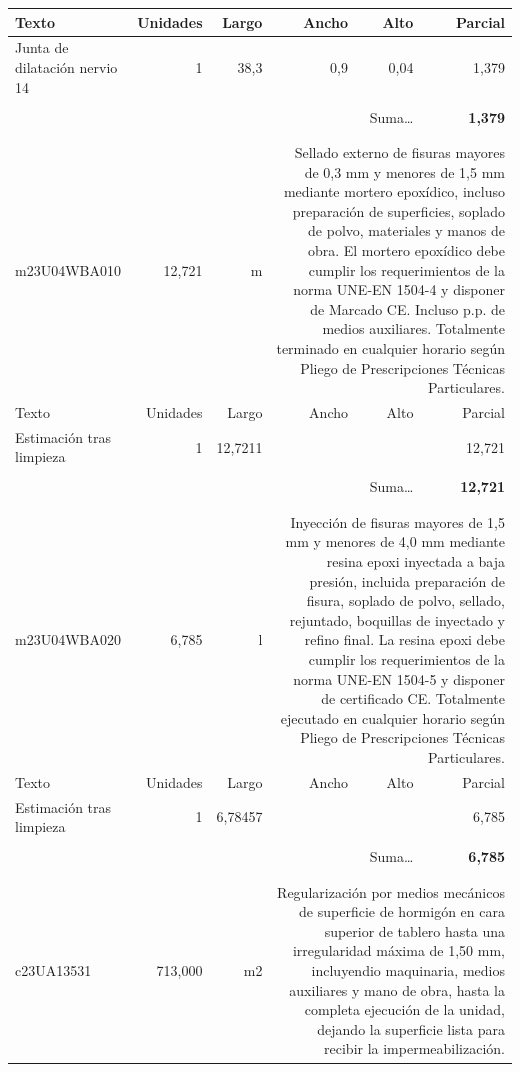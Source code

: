 \documentclass{book}%
\begin{document}
\begin{longtable}{lrrrrr}
Texto&Unidades&Largo&Ancho&Alto&Parcial\\%
\hline%
\multicolumn{1}{p{3.5cm}}{Junta de dilatación nervio 14}&1&38,3&0,9&0,04&     1,379\\%
&&&&&\\%
\multicolumn{5}{r}{Suma\ldots}&\textbf{     1,379}\\%
\hline%
&&&&&\\%
&&&&&\\%
m23U04WBA010&    12,721& m&\multicolumn{3}{p{6cm}}{\scriptsize Sellado externo de fisuras mayores de 0,3 mm y menores de 1,5 mm mediante mortero epoxídico, incluso preparación de superficies, soplado de polvo, materiales y manos de obra. El mortero epoxídico debe cumplir los requerimientos de la norma UNE-EN 1504-4 y disponer de Marcado CE. Incluso p.p. de medios auxiliares. Totalmente terminado en cualquier horario según Pliego de Prescripciones Técnicas Particulares.\normalsize}\\%
Texto&Unidades&Largo&Ancho&Alto&Parcial\\%
\hline%
\multicolumn{1}{p{3.5cm}}{Estimación tras limpieza}&1&12,7211&&&    12,721\\%
&&&&&\\%
\multicolumn{5}{r}{Suma\ldots}&\textbf{    12,721}\\%
\hline%
&&&&&\\%
&&&&&\\%
m23U04WBA020&     6,785& l&\multicolumn{3}{p{6cm}}{\scriptsize Inyección de fisuras mayores de 1,5 mm y menores de 4,0 mm mediante resina epoxi inyectada a baja presión, incluida preparación de fisura, soplado de polvo, sellado, rejuntado, boquillas de inyectado y refino final. La resina epoxi debe cumplir los requerimientos de la norma UNE-EN 1504-5 y disponer de certificado CE. Totalmente ejecutado en cualquier horario según Pliego de Prescripciones Técnicas Particulares.\normalsize}\\%
Texto&Unidades&Largo&Ancho&Alto&Parcial\\%
\hline%
\multicolumn{1}{p{3.5cm}}{Estimación tras limpieza}&1&6,78457&&&     6,785\\%
&&&&&\\%
\multicolumn{5}{r}{Suma\ldots}&\textbf{     6,785}\\%
\hline%
&&&&&\\%
&&&&&\\%
c23UA13531&   713,000& m2&\multicolumn{3}{p{6cm}}{\scriptsize Regularización por medios mecánicos de superficie de hormigón en cara superior de tablero hasta una irregularidad máxima de 1,50 mm, incluyendio maquinaria, medios auxiliares y mano de obra, hasta la completa ejecución de la unidad, dejando la superficie lista para recibir la impermeabilización.\normalsize}\\%

\end{longtable}
\end{document}
